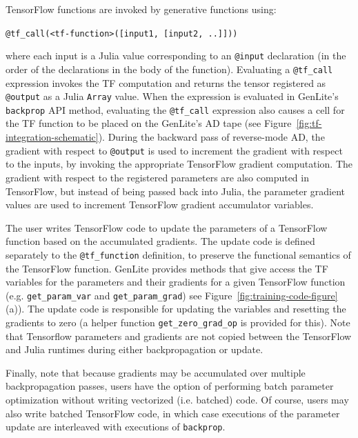 \documentclass{article}
\begin{document}
TensorFlow functions are invoked by generative functions using:
\begin{center}
    \texttt{@tf\_call(<tf-function>([input1, [input2, ..]]))}
\end{center}
where each input is a Julia value corresponding to an \texttt{@input} declaration (in the order of the declarations in the body of the function).
Evaluating a \texttt{@tf\_call} expression invokes the TF computation and returns the tensor registered as \texttt{@output} as a Julia \texttt{Array} value.
When the expression is evaluated in GenLite's \texttt{backprop} API method, evaluating the \texttt{@tf\_call} expression also causes a cell for the TF function to be placed on the GenLite's AD tape (see Figure~\ref{fig:tf-integration-schematic}).
During the backward pass of reverse-mode AD, the gradient with respect to \texttt{@output} is used to increment the gradient with respect to the inputs, by invoking the appropriate TensorFlow gradient computation.
The gradient with respect to the registered parameters are also computed in TensorFlow, but instead of being passed back into Julia, the parameter gradient values are used to increment TensorFlow gradient accumulator variables.

The user writes TensorFlow code to update the parameters of a TensorFlow function based on the accumulated gradients.
The update code is defined separately to the \texttt{@tf\_function} definition, to preserve the functional semantics of the TensorFlow function.
GenLite provides methods that give access the TF variables for the parameters and their gradients for a given TensorFlow function (e.g. \texttt{get\_param\_var} and \texttt{get\_param\_grad}) see Figure~\ref{fig:training-code-figure}(a)).
The update code is responsible for updating the variables and resetting the gradients to zero (a helper function \texttt{get\_zero\_grad\_op} is provided for this).
Note that Tensorflow parameters and gradients are not copied between the TensorFlow and Julia runtimes during either backpropagation or update.

Finally, note that because gradients may be accumulated over multiple backpropagation passes, users have the option of performing batch parameter optimization without writing vectorized (i.e. batched) code.
Of course, users may also write batched TensorFlow code, in which case executions of the parameter update are interleaved with executions of \texttt{backprop}.
\end{document}
